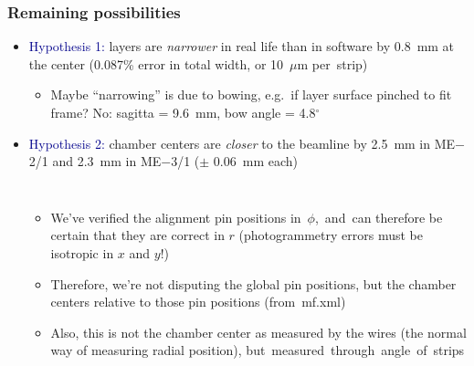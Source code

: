 \documentclass[compress]{beamer}
\begin{document}
\begin{frame}
\frametitle{Remaining possibilities}
\begin{itemize}\setlength{\itemsep}{0.2 cm}
\item \textcolor{darkblue}{Hypothesis 1:} layers are {\it narrower} in
  real life than in software by 0.8~mm at the center (0.087\% error in
  total width, or 10~$\mu$m \mbox{per strip)\hspace{-1 cm}}

\begin{itemize}
\item Maybe ``narrowing'' is due to bowing, e.g.\ if
  layer surface pinched to fit frame?  No: sagitta = 9.6~mm, bow angle = 4.8$^\circ$

\end{itemize}

\item \textcolor{darkblue}{Hypothesis 2:} chamber centers are {\it
  closer} to the beamline by 2.5~mm in ME$-$2/1 and 2.3~mm in ME$-$3/1 ($\pm$ 0.06~mm each)

\begin{columns}

\begin{itemize}
\item We've verified the alignment pin positions \mbox{in $\phi$, and can\hspace{-2 cm}}
  therefore be certain that they are correct in $r$ (photogrammetry
  errors must be isotropic in $x$ and $y$!)
\item Therefore, we're not disputing the global pin positions, but the
  chamber centers relative to those pin positions \mbox{(from mf.xml)\hspace{-1 cm}}
\item Also, this is not the chamber center as measured by the wires
  (the normal way of measuring radial position), \mbox{but measured through angle of strips\hspace{-4 cm}}
\end{itemize}



\end{columns}
\end{itemize}
\end{frame}
\end{document}

